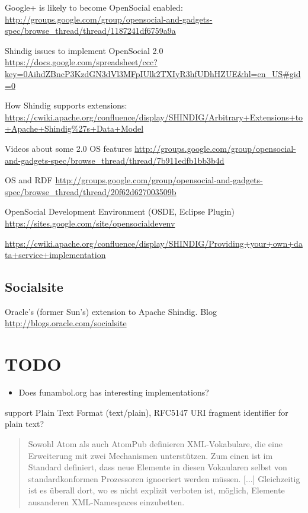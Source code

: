 \documentclass[12pt,a4paper]{scrartcl}		%
\begin{document}
Google+ is likely to become OpenSocial enabled: \url{http://groups.google.com/group/opensocial-and-gadgets-spec/browse_thread/thread/1187241df6759a9a}

Shindig issues to implement OpenSocial 2.0 \url{https://docs.google.com/spreadsheet/ccc?key=0AihdZBncP3KzdGN3dVl3MFpIUlk2TXIyR3hfUDhHZUE&hl=en_US#gid=0}

How Shindig supports extensions: \url{https://cwiki.apache.org/confluence/display/SHINDIG/Arbitrary+Extensions+to+Apache+Shindig%27s+Data+Model}

Videos about some 2.0 OS features \url{http://groups.google.com/group/opensocial-and-gadgets-spec/browse_thread/thread/7b911edfb1bb3b4d}

OS and RDF \url{http://groups.google.com/group/opensocial-and-gadgets-spec/browse_thread/thread/20f62d627003509b}

OpenSocial Development Environment (OSDE, Eclipse Plugin)  \url{https://sites.google.com/site/opensocialdevenv}

\url{https://cwiki.apache.org/confluence/display/SHINDIG/Providing+your+own+data+service+implementation}

\subsection{Socialsite}

Oracle's (former Sun's) extension to Apache Shindig. Blog \url{http://blogs.oracle.com/socialsite}

\section{TODO}
\begin{itemize}
\item Does funambol.org has interesting implementations?
\end{itemize}



support Plain Text Format (text/plain), RFC5147 URI fragment identifier for plain text?

\begin{quote}
  Sowohl Atom als auch AtomPub definieren XML-Vokabulare, die eine Erweiterung
  mit zwei Mechanismen unterstützen. Zum einen ist im Standard definiert, dass
  neue Elemente in diesen Vokaularen selbst von standardkonformen Prozessoren
  ignoeriert werden müssen. [...] Gleichzeitig ist es überall dort, wo es nicht
  explizit verboten ist, möglich, Elemente ausanderen XML-Namespaces
  einzubetten.
\end{quote}\cite[p. 102]{Tilkov2011}


{}

\end{document}

